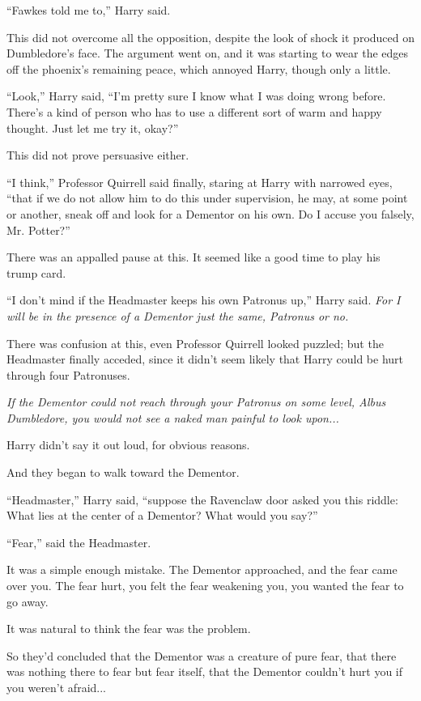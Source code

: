 ``Fawkes told me to,'' Harry said.

This did not overcome all the opposition, despite the look of shock it
produced on Dumbledore's face. The argument went on, and it was starting
to wear the edges off the phoenix's remaining peace, which annoyed
Harry, though only a little.

``Look,'' Harry said, ``I'm pretty sure I know what I was doing wrong
before. There's a kind of person who has to use a different sort of warm
and happy thought. Just let me try it, okay?''

This did not prove persuasive either.

``I think,'' Professor Quirrell said finally, staring at Harry with
narrowed eyes, ``that if we do not allow him to do this under
supervision, he may, at some point or another, sneak off and look for a
Dementor on his own. Do I accuse you falsely, Mr. Potter?''

There was an appalled pause at this. It seemed like a good time to play
his trump card.

``I don't mind if the Headmaster keeps his own Patronus up,'' Harry
said. \emph{For I will be in the presence of a Dementor just the same,
Patronus or no.}

There was confusion at this, even Professor Quirrell looked puzzled; but
the Headmaster finally acceded, since it didn't seem likely that Harry
could be hurt through four Patronuses.

\emph{If the Dementor could not reach through your Patronus on some
level, Albus Dumbledore, you would not see a naked man painful to look
upon...}

Harry didn't say it out loud, for obvious reasons.

And they began to walk toward the Dementor.

``Headmaster,'' Harry said, ``suppose the Ravenclaw door asked you this
riddle: What lies at the center of a Dementor? What would you say?''

``Fear,'' said the Headmaster.

It was a simple enough mistake. The Dementor approached, and the fear
came over you. The fear hurt, you felt the fear weakening you, you
wanted the fear to go away.

It was natural to think the fear was the problem.

So they'd concluded that the Dementor was a creature of pure fear, that
there was nothing there to fear but fear itself, that the Dementor
couldn't hurt you if you weren't afraid...


